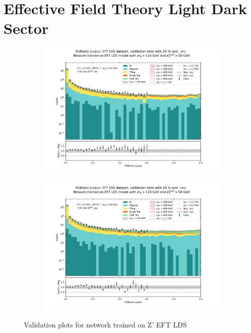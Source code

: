 \documentclass[12pt, a4paper]{book}
\begin{document}
\section{Effective Field Theory Light Dark Sector}
\begin{figure}[!ht]
	\centering
	\begin{subfigure}[b]{0.49\textwidth}
      \centering
      \includegraphics[width=1\textwidth]{XGBoost/EFT_LDS/VAL_ee.pdf}
      \end{subfigure}
   \hfill
   \begin{subfigure}[b]{0.49\textwidth}
      \centering
      \includegraphics[width=1\textwidth]{XGBoost/EFT_LDS/VAL_uu.pdf}
      \end{subfigure}
   \caption{Validation plots for network trained on Z' EFT LDS}\label{fig:EFT_LDS_vals}
\end{figure}
\end{document}
